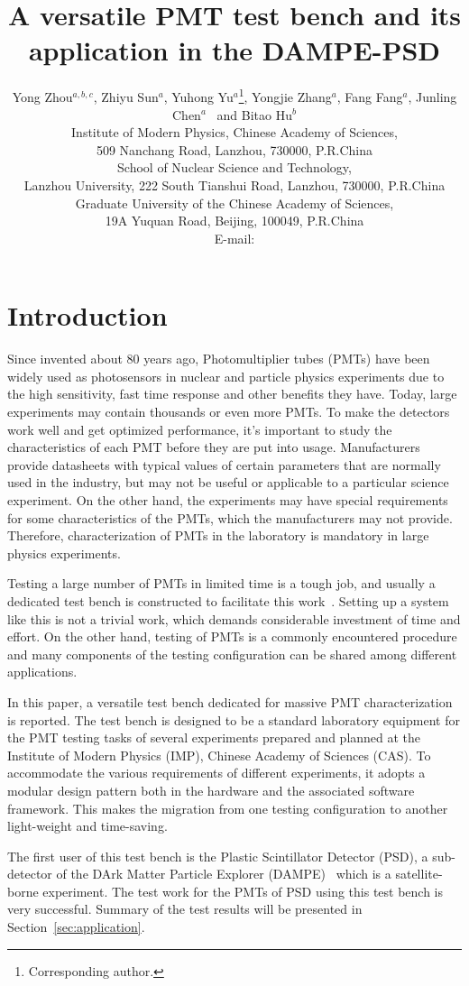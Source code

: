 \documentclass{JINST}
\title{A versatile PMT test bench and its application in the DAMPE-PSD}
\author{Yong Zhou$^{a,b,c}$,
Zhiyu Sun$^a$,
Yuhong Yu$^a$\thanks{Corresponding author.},
Yongjie Zhang$^a$,
Fang Fang$^a$,
Junling Chen$^a$~
and Bitao Hu$^b$\\
\llap{$^a$}Institute of Modern Physics, Chinese Academy of Sciences,\\
           509 Nanchang Road, Lanzhou, 730000, P.R.China\\
\llap{$^b$}School of Nuclear Science and Technology,\\
           Lanzhou University, 222 South Tianshui Road, Lanzhou, 730000, P.R.China\\
\llap{$^c$}Graduate University of the Chinese Academy of Sciences,\\
           19A Yuquan Road, Beijing, 100049, P.R.China\\
E-mail: \email{yuyuhong@impcas.ac.cn}}
\begin{document}
\section{Introduction}
\label{sec:introduction}

Since invented about 80 years ago, Photomultiplier tubes (PMTs) have been widely used as photosensors in nuclear and particle physics experiments due to the high sensitivity, fast time response and other benefits they have. 
Today, large experiments may contain thousands or even more PMTs. To make the detectors work well and get optimized performance, it's important to study the characteristics of each PMT before they are put into usage. 
Manufacturers provide datasheets with typical values of certain parameters that are normally used in the industry, but may not be useful or applicable to a particular science experiment.
On the other hand, the experiments may have special requirements for some characteristics of the PMTs, which the manufacturers may not provide. 
Therefore, characterization of PMTs in the laboratory is mandatory in large physics experiments.

Testing a large number of PMTs in limited time is a tough job, and usually a dedicated test bench is constructed to facilitate this work~\cite{barnhill_testing_2008,akgun_complete_2005,adragna_pmt-block_2006}.
Setting up a system like this is not a trivial work, which demands considerable investment of time and effort.
On the other hand, testing of PMTs is a commonly encountered procedure and many components of the testing configuration can be shared among different applications.

In this paper, a versatile test bench dedicated for massive PMT characterization is reported.
The test bench is designed to be a standard laboratory equipment for the PMT testing tasks of several experiments prepared and planned at the Institute of Modern Physics (IMP), Chinese Academy of Sciences (CAS).
To accommodate the various requirements of different experiments, it adopts a modular design pattern both in the hardware and the associated software framework.
This makes the migration from one testing configuration to another light-weight and time-saving.

The first user of this test bench is the Plastic Scintillator Detector (PSD), a sub-detector of the DArk Matter Particle Explorer (DAMPE)~\cite{Chang_Jin_dampe} which is a satellite-borne experiment. 
The test work for the PMTs of PSD using this test bench is very successful. Summary of the test results will be presented in Section~\ref{sec:application}.
\end{document}
